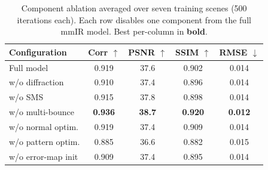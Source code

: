 \begin{table}[ht!]
\caption{Component ablation averaged over seven training scenes (500
iterations each). Each row disables one component from the full mmIR
model. Best per-column in \textbf{bold}.}
\centering
\begin{tabular}{lcccc}
\toprule
\textbf{Configuration} & \textbf{Corr $\uparrow$} & \textbf{PSNR $\uparrow$} & \textbf{SSIM $\uparrow$} & \textbf{RMSE $\downarrow$} \\
\midrule
Full model              & 0.919 & 37.6 & 0.902 & 0.014 \\
\midrule
w/o diffraction         & 0.910 & 37.4 & 0.896 & 0.014 \\
w/o SMS                 & 0.915 & 37.8 & 0.898 & 0.014 \\
w/o multi-bounce        & \textbf{0.936} & \textbf{38.7} & \textbf{0.920} & \textbf{0.012} \\
w/o normal optim.       & 0.919 & 37.4 & 0.909 & 0.014 \\
w/o pattern optim.      & 0.885 & 36.6 & 0.882 & 0.015 \\
w/o error-map init      & 0.909 & 37.4 & 0.895 & 0.014 \\
\bottomrule
\end{tabular}
\label{tab:ablation}
\end{table}

